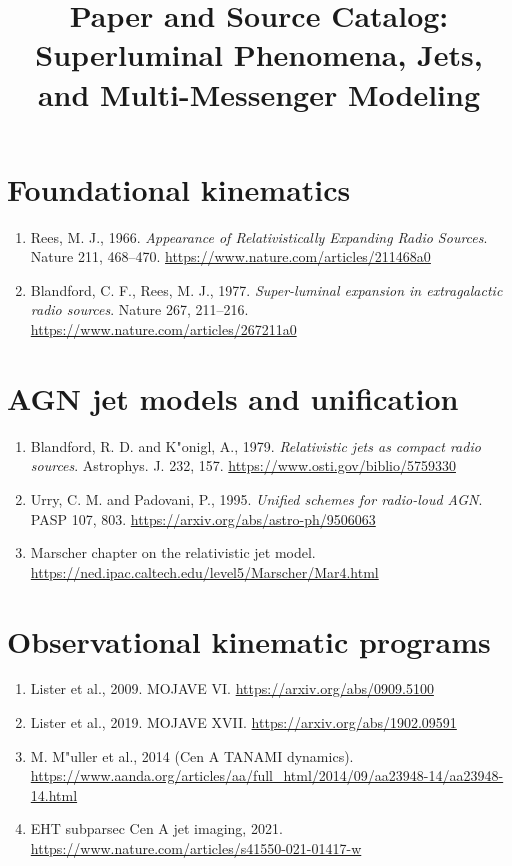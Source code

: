 \documentclass[11pt]{article}
\begin{document}
\title{Paper and Source Catalog: Superluminal Phenomena, Jets, and Multi-Messenger Modeling}
\date{}
\maketitle

\section{Foundational kinematics}
\begin{enumerate}
\item Rees, M. J., 1966. \emph{Appearance of Relativistically Expanding Radio Sources}. Nature 211, 468--470. \url{https://www.nature.com/articles/211468a0}
\item Blandford, C. F., Rees, M. J., 1977. \emph{Super-luminal expansion in extragalactic radio sources}. Nature 267, 211--216. \url{https://www.nature.com/articles/267211a0}
\end{enumerate}

\section{AGN jet models and unification}
\begin{enumerate}
\item Blandford, R. D. and K"onigl, A., 1979. \emph{Relativistic jets as compact radio sources}. Astrophys. J. 232, 157. \url{https://www.osti.gov/biblio/5759330}
\item Urry, C. M. and Padovani, P., 1995. \emph{Unified schemes for radio-loud AGN}. PASP 107, 803. \url{https://arxiv.org/abs/astro-ph/9506063}
\item Marscher chapter on the relativistic jet model. \url{https://ned.ipac.caltech.edu/level5/Marscher/Mar4.html}
\end{enumerate}

\section{Observational kinematic programs}
\begin{enumerate}
\item Lister et al., 2009. MOJAVE VI. \url{https://arxiv.org/abs/0909.5100}
\item Lister et al., 2019. MOJAVE XVII. \url{https://arxiv.org/abs/1902.09591}
\item M. M"uller et al., 2014 (Cen A TANAMI dynamics). \url{https://www.aanda.org/articles/aa/full_html/2014/09/aa23948-14/aa23948-14.html}
\item EHT subparsec Cen A jet imaging, 2021. \url{https://www.nature.com/articles/s41550-021-01417-w}
\end{enumerate}
\end{document}
